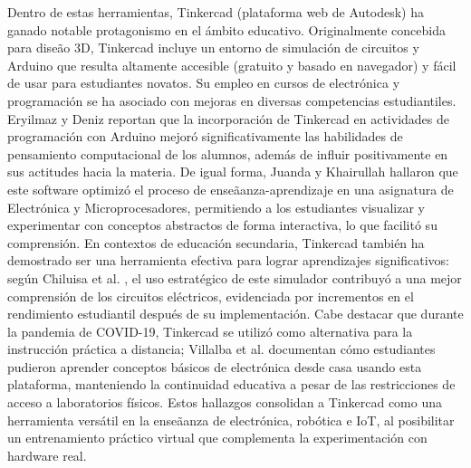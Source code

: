 \documentclass{article}
\begin{document}
Dentro de estas herramientas, Tinkercad (plataforma web de Autodesk) ha ganado notable protagonismo en el \'ambito educativo. Originalmente concebida para dise\~ao 3D, Tinkercad incluye un entorno de simulación de circuitos y Arduino que resulta altamente accesible (gratuito y basado en navegador) y f\'acil de usar para estudiantes novatos. Su empleo en cursos de electrónica y programación se ha asociado con mejoras en diversas competencias estudiantiles. Eryilmaz y Deniz \cite{Eryilmaz2021} reportan que la incorporación de Tinkercad en actividades de programación con Arduino mejoró significativamente las habilidades de pensamiento computacional de los alumnos, adem\'as de influir positivamente en sus actitudes hacia la materia. De igual forma, Juanda y Khairullah \cite{Juanda2020} hallaron que este software optimizó el proceso de ense\~aanza-aprendizaje en una asignatura de Electrónica y Microprocesadores, permitiendo a los estudiantes visualizar y experimentar con conceptos abstractos de forma interactiva, lo que facilitó su comprensión. En contextos de educación secundaria, Tinkercad también ha demostrado ser una herramienta efectiva para lograr aprendizajes significativos: según Chiluisa et al. \cite{Chiluisa2022}, el uso estratégico de este simulador contribuyó a una mejor comprensión de los circuitos eléctricos, evidenciada por incrementos en el rendimiento estudiantil después de su implementación. Cabe destacar que durante la pandemia de COVID-19, Tinkercad se utilizó como alternativa para la instrucción pr\'actica a distancia; Villalba et al. \cite{Villalba2021} documentan cómo estudiantes pudieron aprender conceptos b\'asicos de electrónica desde casa usando esta plataforma, manteniendo la continuidad educativa a pesar de las restricciones de acceso a laboratorios f\'isicos. Estos hallazgos consolidan a Tinkercad como una herramienta vers\'atil en la ense\~aanza de electrónica, robótica e IoT, al posibilitar un entrenamiento pr\'actico virtual que complementa la experimentación con hardware real.
\\\\
\end{document}
